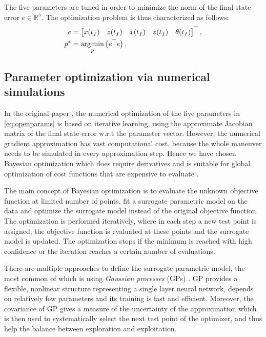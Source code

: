 The five parameters are tuned in order to minimize the norm of the final state error $e\in\mathbb{R}^5$. The optimization problem is thus characterized as follows:
\begin{subequations}\label{eq:optim}
\begin{align}
e &= \begin{bmatrix}
x(t_f) & z(t_f) & \dot{x}(t_f) & \dot{z}(t_f)& \theta(t_f)
\end{bmatrix}^\top,\\
p^* &= \operatorname*{arg\,min}_p \left(e^\top e\right).
\end{align} 
\end{subequations}

\subsection{Parameter optimization via numerical simulations}

In the original paper \cite{LSICRA2010}, the numerical optimization of the five parameters in \eqref{eq:openparams} is based on iterative learning, using the approximate Jacobian matrix of the final state error w.r.t the parameter vector. However, the numerical gradient approximation has vast computational cost, because the whole maneuver needs to be simulated in every approximation step. Hence we have chosen Bayesian optimization which does require derivatives and is suitable for global optimization of cost functions that are expensive to evaluate \cite{frazier2018tutorial, bayesopt2, brochu2010tutorial}.

The main concept of Bayesian optimization is to evaluate the unknown objective function at limited number of points, fit a surrogate parametric model on the data and optimize the surrogate model instead of the original objective function. The optimization is performed iteratively, where in each step a new test point is assigned, the objective function is evaluated at these points and the surrogate model is updated. The optimization stops if the minimum is reached with high confidence or the iteration reaches a certain number of evaluations. 

There are multiple approaches to define the surrogate parametric model, the most common of which is using \textit{Gaussian processes} (GPs) \cite{GPMPC2019}. GP provides a flexible, nonlinear structure representing a single layer neural network, depends on relatively few parameters and its training is fast and efficient. Moreover, the covariance of GP gives a measure of the uncertainty of the approximation which is then used to systematically select the next test point of the optimizer, and thus help the balance between exploration and exploitation.

